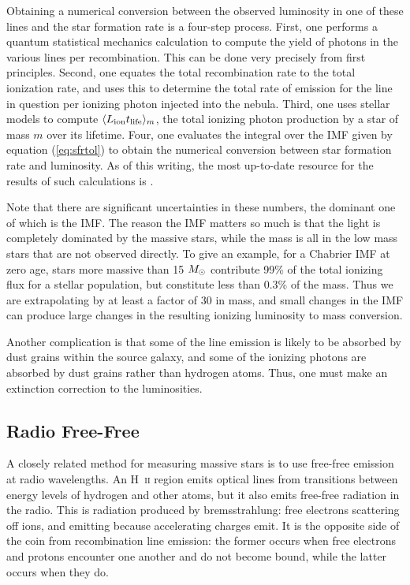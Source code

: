 Obtaining a numerical conversion between the observed luminosity in one of these lines and the star formation rate is a four-step process. First, one performs a quantum statistical mechanics calculation to compute the yield of photons in the various lines per recombination. This can be done very precisely from first principles. Second, one equates the total recombination rate to the total ionization rate, and uses this to determine the total rate of emission for the line in question per ionizing photon injected into the nebula. Third, one uses stellar models to compute $\langle L_{\rm ion} t_{\rm life}\rangle_m$, the total ionizing photon production by a star of mass $m$ over its lifetime. Four, one evaluates the integral over the IMF given by equation (\ref{eq:sfrtol}) to obtain the numerical conversion between star formation rate and luminosity. As of this writing, the most up-to-date resource for the results of such calculations is \citet{kennicutt12a}.

Note that there are significant uncertainties in these numbers, the dominant one of which is the IMF. The reason the IMF matters so much is that the light is completely dominated by the massive stars, while the mass is all in the low mass stars that are not observed directly. To give an example, for a Chabrier IMF at zero age, stars more massive than 15 $M_{\odot}$ contribute 99\% of the total ionizing flux for a stellar population, but constitute less than 0.3\% of the mass. Thus we are extrapolating by at least a factor of 30 in mass, and small changes in the IMF can produce large changes in the resulting ionizing luminosity to mass conversion.

Another complication is that some of the line emission is likely to be absorbed by dust grains within the source galaxy, and some of the ionizing photons are absorbed by dust grains rather than hydrogen atoms. Thus, one must make an extinction correction to the luminosities.

\subsection{Radio Free-Free}

A closely related method for measuring massive stars is to use free-free emission at radio wavelengths. An H~\textsc{ii} region emits optical lines from transitions between energy levels of hydrogen and other atoms, but it also emits free-free radiation in the radio. This is radiation produced by bremsstrahlung: free electrons scattering off ions, and emitting because accelerating charges emit. It is the opposite side of the coin from recombination line emission: the former occurs when free electrons and protons encounter one another and do not become bound, while the latter occurs when they do.

